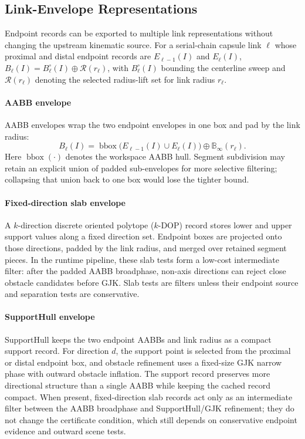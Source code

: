 \documentclass[journal]{IEEEtran}
\newcommand{\Ball}{\ensuremath{\mathbb{B}}}
\begin{document}
\subsection{Link-Envelope Representations}\label{sec:rewrite_link_env}

Endpoint records can be exported to multiple link representations without
changing the upstream kinematic source. For a serial-chain capsule link \(\ell\)
whose proximal and distal endpoint records are \(E_{\ell-1}(I)\) and
\(E_\ell(I)\),
$B_\ell(I)=B_\ell^\circ(I)\oplus\mathcal{R}(r_\ell)$, with
$B_\ell^\circ(I)$ bounding the centerline sweep and \(\mathcal{R}(r_\ell)\)
denoting the selected radius-lift set for link radius \(r_\ell\).

\paragraph{AABB envelope}
AABB envelopes wrap the two endpoint envelopes in one box and pad by the link
radius:
\[
B_\ell(I) = \operatorname{bbox}\bigl(E_{\ell-1}(I) \cup E_\ell(I)\bigr)
\oplus \Ball_\infty(r_\ell).
\]
Here \(\operatorname{bbox}(\cdot)\) denotes the workspace AABB hull.
Segment subdivision may retain an explicit union of padded sub-envelopes for
more selective filtering; collapsing that union back to one box would lose the
tighter bound.

\paragraph{Fixed-direction slab envelope}
A \(k\)-direction discrete oriented polytope (\(k\)-DOP) record stores
lower and upper support values along a fixed direction set. Endpoint boxes are
projected onto those directions, padded by the link radius, and merged over
retained segment pieces. In the runtime pipeline, these slab tests form a low-cost
intermediate filter: after the padded AABB broadphase, non-axis directions can
reject close obstacle candidates before GJK\@. Slab tests are filters unless
their endpoint source and separation tests are conservative.

\paragraph{SupportHull envelope}
SupportHull keeps the two endpoint AABBs and link radius as a compact support
record. For direction $d$, the support point is selected from the proximal or
distal endpoint box, and obstacle refinement uses a fixed-size GJK narrow phase
with outward obstacle inflation. The support record preserves more directional
structure than a single AABB while keeping the cached record compact. When present,
fixed-direction slab records act only as an intermediate filter between the AABB
broadphase and SupportHull/GJK refinement; they do not change the certificate
condition, which still depends on conservative endpoint evidence and outward
scene tests.
\end{document}
